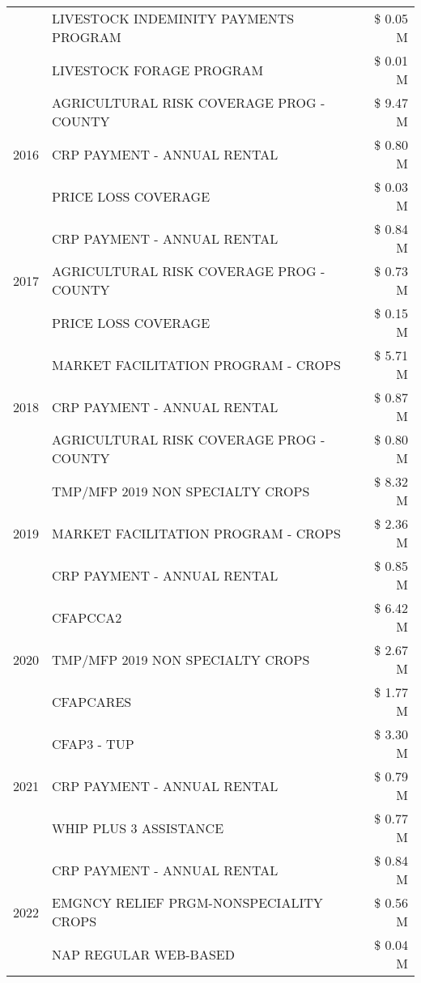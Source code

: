 \begin{tabular}{llr}
 & LIVESTOCK INDEMINITY PAYMENTS PROGRAM & \$ 0.05 M \\
 & LIVESTOCK FORAGE PROGRAM & \$ 0.01 M \\
\cline{1-3}
\multirow[t]{3}{*}{2016} & AGRICULTURAL RISK COVERAGE PROG - COUNTY & \$ 9.47 M \\
 & CRP PAYMENT - ANNUAL RENTAL & \$ 0.80 M \\
 & PRICE LOSS COVERAGE & \$ 0.03 M \\
\cline{1-3}
\multirow[t]{3}{*}{2017} & CRP PAYMENT - ANNUAL RENTAL & \$ 0.84 M \\
 & AGRICULTURAL RISK COVERAGE PROG - COUNTY & \$ 0.73 M \\
 & PRICE LOSS COVERAGE & \$ 0.15 M \\
\cline{1-3}
\multirow[t]{3}{*}{2018} & MARKET FACILITATION PROGRAM - CROPS & \$ 5.71 M \\
 & CRP PAYMENT - ANNUAL RENTAL & \$ 0.87 M \\
 & AGRICULTURAL RISK COVERAGE PROG - COUNTY & \$ 0.80 M \\
\cline{1-3}
\multirow[t]{3}{*}{2019} & TMP/MFP 2019 NON SPECIALTY CROPS & \$ 8.32 M \\
 & MARKET FACILITATION PROGRAM - CROPS & \$ 2.36 M \\
 & CRP PAYMENT - ANNUAL RENTAL & \$ 0.85 M \\
\cline{1-3}
\multirow[t]{3}{*}{2020} & CFAPCCA2 & \$ 6.42 M \\
 & TMP/MFP 2019 NON SPECIALTY CROPS & \$ 2.67 M \\
 & CFAPCARES & \$ 1.77 M \\
\cline{1-3}
\multirow[t]{3}{*}{2021} & CFAP3 - TUP & \$ 3.30 M \\
 & CRP PAYMENT - ANNUAL RENTAL & \$ 0.79 M \\
 & WHIP PLUS 3 ASSISTANCE & \$ 0.77 M \\
\cline{1-3}
\multirow[t]{3}{*}{2022} & CRP PAYMENT - ANNUAL RENTAL & \$ 0.84 M \\
 & EMGNCY RELIEF PRGM-NONSPECIALITY CROPS & \$ 0.56 M \\
 & NAP REGULAR WEB-BASED & \$ 0.04 M \\
\cline{1-3}
\bottomrule
\end{tabular}
